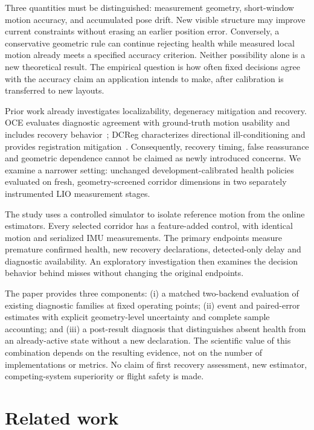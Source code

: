 \documentclass[11pt,a4paper]{article}
\begin{document}
Three quantities must be distinguished: measurement geometry, short-window
motion accuracy, and accumulated pose drift. New visible structure may
improve current constraints without erasing an earlier position error.
Conversely, a conservative geometric rule can continue rejecting health
while measured local motion already meets a specified accuracy criterion.
Neither possibility alone is a new theoretical result. The empirical
question is how often fixed decisions agree with the accuracy claim an
application intends to make, after calibration is transferred to new layouts.

Prior work already investigates localizability, degeneracy mitigation and
recovery. OCE evaluates diagnostic agreement with ground-truth motion
usability and includes recovery behavior~\cite{oce}; DCReg characterizes
directional ill-conditioning and provides registration mitigation~\cite{dcreg}.
Consequently, recovery timing, false reassurance and geometric dependence
cannot be claimed as newly introduced concerns. We examine a narrower
setting: unchanged development-calibrated health policies evaluated on
fresh, geometry-screened corridor dimensions in two separately instrumented
LIO measurement stages.

The study uses a controlled simulator to isolate reference motion from the
online estimators. Every selected corridor has a feature-added control,
with identical motion and serialized IMU measurements. The primary endpoints
measure premature confirmed health, new recovery declarations, detected-only
delay and diagnostic availability. An exploratory investigation then examines
the decision behavior behind misses without changing the original endpoints.

The paper provides three components: (i) a matched two-backend evaluation
of existing diagnostic families at fixed operating points; (ii) event and
paired-error estimates with explicit geometry-level uncertainty and complete
sample accounting; and (iii) a post-result diagnosis that distinguishes
absent health from an already-active state without a new declaration.
The scientific value of this combination depends on the resulting evidence,
not on the number of implementations or metrics. No claim of first recovery
assessment, new estimator, competing-system superiority or flight safety is
made.

\section{Related work}
\end{document}
